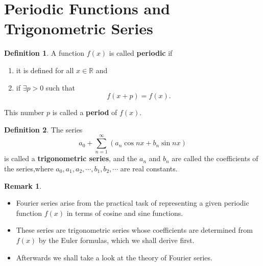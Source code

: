 \documentclass[12pt,openany]{book}
\theoremstyle{definition}
\newtheorem{definition}{Definition}[chapter]
\newtheorem{remark}{Remark}[chapter]
\newcommand{\R}{\mathbb{R}}
\newcommand{\of}[1]{\left( #1 \right)}
\begin{document}
	\section{Periodic Functions and Trigonometric Series}
	\begin{tcolorbox}[colframe=defcolor, title={\color{white}\bf Periodic Functions}]
		\begin{definition}
			A function $f(x)$ is called \textbf{periodic} if
			\begin{enumerate}[(1)]
				\item it is defined for all $x\in\R$ and
				\item if $\exists p>0$ such that \[
				f(x+p)=f(x).
				\]
			\end{enumerate} This number $p$ is called a \textbf{period} of $f(x)$.
		\end{definition}
	\end{tcolorbox}
	\vspace{20pt}
	\begin{tcolorbox}[colframe=defcolor, title={\color{white}\bf Trigonometric Series}]
		\begin{definition}
			The series \[
			a_0+\sum_{n=1}^\infty\of{a_n\cos nx+b_n\sin nx}
			\] is called a \textbf{trigonometric series}, and the $a_n$ and $b_n$ are called the coefficients of the series,where $a_0, a_1, a_2, \cdots, b_1 , b_2 ,\cdots $ are real constants.
		\end{definition}
	\end{tcolorbox}
	\begin{remark}
		\ \begin{itemize}
			\item Fourier series arise from the practical task of representing a given periodic
			function $f(x)$ in terms of cosine and sine functions.
			\item These series are trigonometric series whose coefficients are determined from $f(x)$
			by the Euler formulas, which we shall derive first.
			\item Afterwards we shall take a look at the theory of Fourier series.
		\end{itemize}
	\end{remark}

	\newpage
\end{document}
